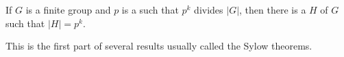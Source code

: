 \documentclass[12pt]{article}
\begin{document}
If $G$ is a finite group and $p$ is a  such that $p^k$ divides $|G|$, then there is a  $H$ of $G$ such that $|H|=p^k$.

This is the first part of several results usually called the Sylow theorems.
\end{document}
